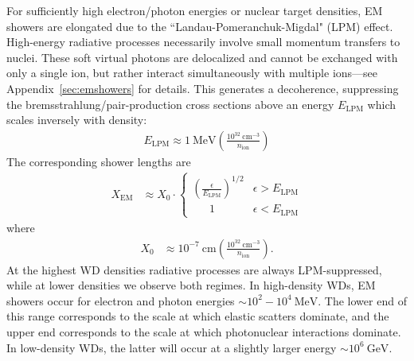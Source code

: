 \documentclass[twocolumn, preprintnumbers,amsmath,amssymb,prd, superscriptaddress]{revtex4}
\newcommand{\GeV}{\text{GeV}}
\newcommand{\MeV}{\text{MeV}}
\def\r{\right)}
\def\l{\left(}
\begin{document}
For sufficiently high electron/photon energies or nuclear target densities, EM showers are elongated due to the ``Landau-Pomeranchuk-Migdal" (LPM) effect.
High-energy radiative processes necessarily involve small momentum transfers to nuclei. 
These soft virtual photons are delocalized and cannot be exchanged with only a single ion, but rather interact simultaneously with multiple ions---see Appendix~\ref{sec:emshowers} for details. 
This generates a decoherence, suppressing the bremsstrahlung/pair-production cross sections above an energy $E_\text{LPM}$ which scales inversely with density:
\begin{align}
    E_\text{LPM} \approx 1~\MeV
    \l \frac{10^{32}~\text{cm}^{-3}}{n_\text{ion}} \r
\end{align}
The corresponding shower lengths are
\begin{align}
  X_\text{EM} &\approx X_0 \cdot \begin{cases}
  \l \frac{\epsilon}{E_\text{LPM}} \r^{1/2} & \epsilon > E_\text{LPM} \\
  \;\;\;\;\;\, 1 & \epsilon < E_\text{LPM}
  \end{cases}
\end{align}
where
\begin{align}
  X_0 &\approx 10^{-7} ~\text{cm}
  \l\frac{10^{32}~\text{cm}^{-3}}{n_\text{ion}}\r.
\end{align}
At the highest WD densities radiative processes are always LPM-suppressed, while at lower densities we observe both regimes.
In high-density WDs, EM showers occur for electron and photon energies $\sim 10^2 - 10^4~\text{MeV}$.
The lower end of this range corresponds to the scale at which elastic scatters dominate, and the upper end corresponds to the scale at which photonuclear interactions dominate. 
In low-density WDs, the latter will occur at a slightly larger energy $\sim 10^6 ~\GeV$. 
\end{document}
